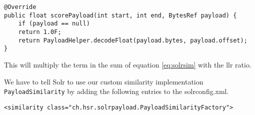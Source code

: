 \begin{description}
\begin{lstlisting}
@Override
public float scorePayload(int start, int end, BytesRef payload) {
    if (payload == null)
	return 1.0F;
    return PayloadHelper.decodeFloat(payload.bytes, payload.offset);
}
\end{lstlisting}
This will multiply the term in the sum of equation \ref{eq:solrsim} with the \gls{llr} ratio.

We have to tell Solr to use our custom similarity implementation \verb|PayloadSimilarity| by adding the following entries to the solrconfig.xml.
\begin{lstlisting}
<similarity class="ch.hsr.solrpayload.PayloadSimilarityFactory">
\end{lstlisting}
\end{description}
